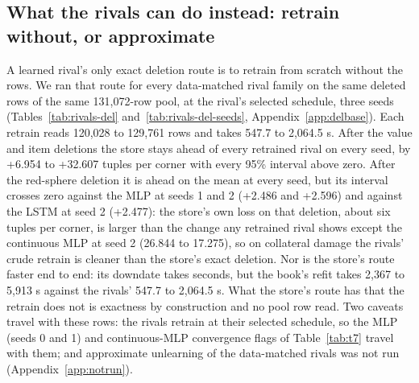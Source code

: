 \documentclass{article} %
\begin{document}
\subsection{What the rivals can do instead: retrain without, or approximate}
\label{sec:del-comparators}

A learned rival's only exact deletion route is to retrain from scratch without the rows. We ran
that route for every data-matched rival family on the same deleted rows of the same 131,072-row %
pool, at the rival's selected schedule, three seeds (Tables~\ref{tab:rivals-del}
and~\ref{tab:rivals-del-seeds}, Appendix~\ref{app:delbase}). Each retrain reads 120,028 to 129,761 %
rows and takes 547.7 to 2,064.5 s. After the value and item deletions the store stays ahead of every %
retrained rival on every seed, by +6.954 to +32.607 tuples per corner with every 95\% interval above %
zero. After the red-sphere deletion it is ahead on the mean at every seed, but its interval crosses
zero against the MLP at seeds 1 and 2 (+2.486 and +2.596) and against the LSTM at seed 2 %
(+2.477): the store's own loss on that deletion, about six tuples per corner, is larger than the %
change any retrained rival shows except the continuous MLP at seed 2 (26.844 to 17.275), so on %
collateral damage the rivals' crude retrain is cleaner than the store's exact deletion. Nor is the
store's route faster end to end: its downdate takes seconds, but the book's refit takes 2,367 to %
5,913 s against the rivals' 547.7 to 2,064.5 s. What the store's route has that the retrain does not %
is exactness by construction and no pool row read. Two caveats travel with these rows: the rivals
retrain at their selected schedule, so the MLP (seeds 0 and 1) and continuous-MLP convergence flags
of Table~\ref{tab:t7} travel with them; and approximate unlearning of the data-matched rivals was not
run (Appendix~\ref{app:notrun}).
\end{document}
